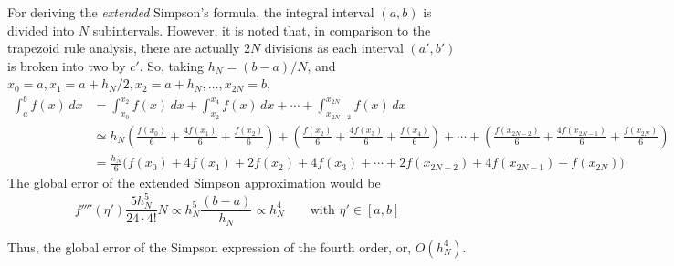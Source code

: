 \documentclass{report}
\begin{document}
For deriving the \emph{extended} Simpson's formula, the integral interval $(a,b)$ is divided into $N$ subintervals. However, it is noted that, in comparison to the trapezoid rule analysis, there are actually $2N$ divisions as each interval $(a',b')$ is broken into two by $c'$. So, taking $h_N=(b-a)/N$, and $x_0=a, x_1= a +h_N/2, x_2= a+h_N, \dots, x_{2N}=b$,
\begin{align*}
	\int_a^b f(x) \, dx &= \int_{x_0}^{x_2} f(x) \, dx + \int_{x_2}^{x_4} f(x) \, dx + \cdots + \int_{x_{2N-2}}^{x_{2N}} f(x) \, dx \\
	&\simeq h_N (\frac{f(x_0)}{6}+\frac{4f(x_1)}{6}+\frac{f(x_2)}{6}) + (\frac{f(x_2)}{6}+\frac{4f(x_3)}{6}+\frac{f(x_4)}{6})+ \cdots + (\frac{f(x_{2N-2})}{6}+\frac{4f(x_{2N-1})}{6}+\frac{f(x_{2N})}{6})\\
	&=\frac{h_N}{6}\Big(f(x_0)+4f(x_1)+2f(x_2)+4f(x_3)+ \cdots +2f(x_{2N-2}) + 4f(x_{2N-1}) + f(x_{2N})\Big)
\end{align*}
The global error of the extended Simpson approximation would be
 $$f''''(\eta')\frac{5h^5_N}{24\cdot 4!}N\propto h_N^5\frac{(b-a)}{h_N}\propto h_N^4\qquad \text{with } \eta'\in[a,b]$$
 
 Thus, the global error of the Simpson expression of the fourth order, or, $O(h_N^4)$.
 \pagebreak
\end{document}
